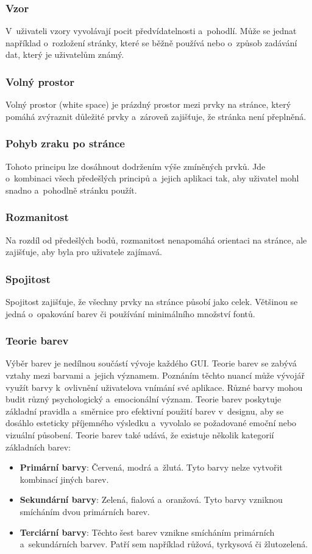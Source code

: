 \subsubsection*{Vzor}
V~uživateli vzory vyvolávají pocit předvídatelnosti a~pohodlí. Může se jednat například o~rozložení stránky, které se běžně používá nebo o~způsob zadávání dat, který je uživatelům známý.

\subsubsection*{Volný prostor}
Volný prostor (white space) je prázdný prostor mezi prvky na stránce, který pomáhá zvýraznit důležité prvky a~zároveň zajišťuje, že stránka není přeplněná.

\subsubsection*{Pohyb zraku po stránce}
Tohoto principu lze dosáhnout dodržením výše zmíněných prvků. Jde o~kombinaci všech předešlých principů a~jejich aplikaci tak, aby uživatel mohl snadno a~pohodlně stránku použít.

\subsubsection*{Rozmanitost}
Na rozdíl od předešlých bodů, rozmanitost nenapomáhá orientaci na stránce, ale zajišťuje, aby byla pro uživatele zajímavá.

\subsubsection*{Spojitost}
Spojitost zajišťuje, že všechny prvky na stránce působí jako celek. Většinou se jedná o~opakování barev či používání minimálního množství fontů.

\subsubsection{Teorie barev}
Výběr barev je nedílnou součástí vývoje každého GUI. Teorie barev se zabývá vztahy mezi barvami a~jejich významem. Poznáním těchto nuancí může vývojář využít barvy k~ovlivnění uživatelova vnímání své aplikace. Různé barvy mohou budit různý psychologický a~emocionální význam. Teorie barev poskytuje základní pravidla a~směrnice pro efektivní použití barev v~designu, aby se dosáhlo esteticky příjemného výsledku a~vyvolalo se požadované emoční nebo vizuální působení. Teorie barev také udává, že existuje několik kategorií základních barev:
\begin{itemize}
    \item \textbf{Primární barvy}: Červená, modrá a~žlutá. Tyto barvy nelze vytvořit kombinací jiných barev.
    \item \textbf{Sekundární barvy}: Zelená, fialová a~oranžová. Tyto barvy vzniknou smícháním dvou primárních barev.
    \item \textbf{Terciární barvy}: Těchto šest barev vznikne smícháním primárních a~sekundárních barvev. Patří sem například růžová, tyrkysová či žlutozelená.
\end{itemize}

